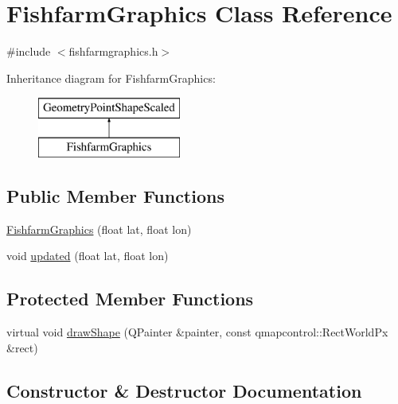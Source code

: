 \hypertarget{class_fishfarm_graphics}{}\section{Fishfarm\+Graphics Class Reference}
\label{class_fishfarm_graphics}


{\ttfamily \#include $<$fishfarmgraphics.\+h$>$}

Inheritance diagram for Fishfarm\+Graphics\+:\begin{figure}[H]
\begin{center}
\leavevmode
\includegraphics[height=2.000000cm]{d0/d85/class_fishfarm_graphics}
\end{center}
\end{figure}
\subsection*{Public Member Functions}
\begin{DoxyCompactItemize}
\item 
\mbox{\hyperlink{class_fishfarm_graphics_a04a00262773d69ef99a18c2bbe18130b}{Fishfarm\+Graphics}} (float lat, float lon)
\item 
void \mbox{\hyperlink{class_fishfarm_graphics_ae508f10ff6cadefddf1316a8fa1dd1ae}{updated}} (float lat, float lon)
\end{DoxyCompactItemize}
\subsection*{Protected Member Functions}
\begin{DoxyCompactItemize}
\item 
virtual void \mbox{\hyperlink{class_fishfarm_graphics_a019d2e0e77ddf4c95ab3a47d914b18d9}{draw\+Shape}} (Q\+Painter \&painter, const qmapcontrol\+::\+Rect\+World\+Px \&rect)
\end{DoxyCompactItemize}


\subsection{Constructor \& Destructor Documentation}
\mbox{\label{class_fishfarm_graphics_a04a00262773d69ef99a18c2bbe18130b}} 
